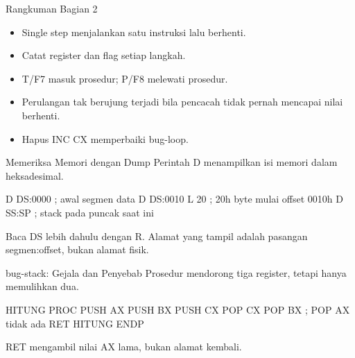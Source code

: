 \documentclass[aspectratio=169,11pt]{beamer}
\begin{document}
\begin{frame}{Rangkuman Bagian 2}
\small
\begin{itemize}
    \item Single step menjalankan satu instruksi lalu berhenti.

    \vspace{0.15em}
    \item Catat register dan flag setiap langkah.

    \vspace{0.15em}
    \item T/F7 masuk prosedur; P/F8 melewati prosedur.

    \vspace{0.15em}
    \item Perulangan tak berujung terjadi bila pencacah tidak pernah
          mencapai nilai berhenti.

    \vspace{0.15em}
    \item Hapus INC CX memperbaiki bug-loop.
\end{itemize}
\end{frame}


\begin{frame}[fragile]{Memeriksa Memori dengan Dump}
\small
Perintah D menampilkan isi memori dalam heksadesimal.

\vspace{0.2em}
\begin{kodeasm}[numbers=none]
D DS:0000           ; awal segmen data
D DS:0010 L 20      ; 20h byte mulai offset 0010h
D SS:SP             ; stack pada puncak saat ini
\end{kodeasm}

\vspace{0.15em}
{\footnotesize\color{obeGray}Baca DS lebih dahulu dengan R. Alamat yang
tampil adalah pasangan segmen:offset, bukan alamat fisik.\par}
\end{frame}

\begin{frame}[fragile]{bug-stack: Gejala dan Penyebab}
\small
Prosedur mendorong tiga register, tetapi hanya memulihkan dua.

\vspace{0.2em}
\begin{kodeasm}[numbers=none]
HITUNG PROC
    PUSH AX
    PUSH BX
    PUSH CX
    POP CX
    POP BX
    ; POP AX tidak ada
    RET
HITUNG ENDP
\end{kodeasm}

\vspace{0.1em}
{\footnotesize\color{obeMaroon}RET mengambil nilai AX lama, bukan alamat
kembali.\par}
\end{frame}
\end{document}

